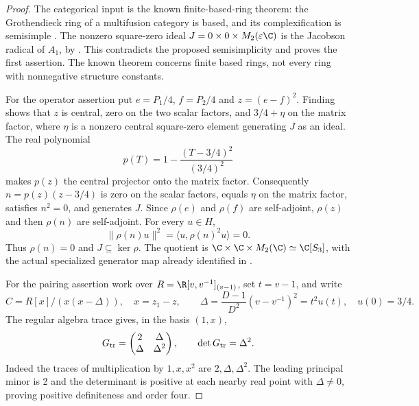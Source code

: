 \begin{proof}
The categorical input is the known finite-based-ring theorem:
the Grothendieck ring of a multifusion category is based, and its
complexification is semisimple
\cite[Definition~1.42.2 and Proposition~1.42.4, pp.~76--77;
Corollary~1.43.5, p.~80]{EGNO2009}.
The nonzero square-zero ideal
$J=0\times0\times M_2(\varepsilon\C)$ is the Jacobson radical
of $A_1$, by . This contradicts the proposed semisimplicity
and proves the first assertion. The known theorem concerns finite
based rings, not every ring with nonnegative structure constants.

For the operator assertion put $e=P_1/4$, $f=P_2/4$ and
$z=(e-f)^2$. Finding~ shows that $z$ is central, zero
on the two scalar factors, and $3/4+\eta$ on the matrix factor,
where $\eta$ is a nonzero central square-zero element generating
$J$ as an ideal. The real polynomial
\[
 p(T)=1-\frac{(T-3/4)^2}{(3/4)^2}
\]
makes $p(z)$ the central projector onto the matrix factor.
Consequently $n=p(z)(z-3/4)$ is zero on the scalar factors,
equals $\eta$ on the matrix factor, satisfies $n^2=0$, and
generates $J$. Since $\rho(e)$ and $\rho(f)$ are self-adjoint,
$\rho(z)$ and then $\rho(n)$ are self-adjoint. For every $u\in H$,
\[
 \|\rho(n)u\|^2=\langle u,\rho(n)^2u\rangle=0.
\]
Thus $\rho(n)=0$ and $J\subseteq\ker\rho$. The quotient is
$\C\times\C\times M_2(\C)\simeq\C[S_3]$, with the actual
specialized generator map already identified in .

For the pairing assertion work over
$R=\R[v,v^{-1}]_{(v-1)}$, set $t=v-1$, and write
\[
 C=R[x]/(x(x-\Delta)),\quad x=z_1-z,\qquad
 \Delta=\frac{D-1}{D^2}(v-v^{-1})^2=t^2u(t),\quad u(0)=3/4.
\]
The regular algebra trace gives, in the basis $(1,x)$,
\[
 G_{\rm tr}=\begin{pmatrix}2&\Delta\\\Delta&\Delta^2\end{pmatrix},
 \qquad \det G_{\rm tr}=\Delta^2.
\]
Indeed the traces of multiplication by $1,x,x^2$ are
$2,\Delta,\Delta^2$. The leading principal minor is 2 and the
determinant is positive at each nearby real point with
$\Delta\ne0$, proving positive definiteness and order four.


\end{proof}
